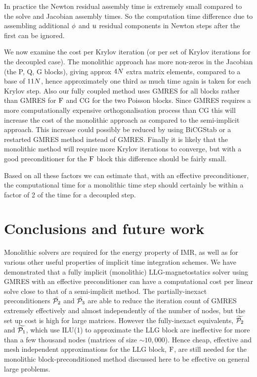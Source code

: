 In practice the Newton residual assembly time is extremely small compared to the solve and Jacobian assembly times.
So the computation time difference due to assembling additional $\phi$ and $u$ residual components in Newton steps after the first can be ignored.

We now examine the cost per Krylov iteration (or per set of Krylov iterations for the decoupled case).
The monolithic approach has more non-zeros in the Jacobian (the P, Q, G blocks), giving approx $4 N$ extra matrix elements, compared to a base of $11 N$, hence approximately one third as much time again is taken for each Krylov step.
Also our fully coupled method uses GMRES for all blocks rather than GMRES for $\mathrm{F}$ and CG for the two Poisson blocks.
Since GMRES requires a more computationally expensive orthogonalisation process than CG this will increase the cost of the monolithic approach as compared to the semi-implicit approach.
This increase could possibly be reduced by using BiCGStab or a restarted GMRES method instead of GMRES.
Finally it is likely that the monolithic method will require more Krylov iterations to converge, but with a good preconditioner for the $\mathrm{F}$ block this difference should be fairly small.

Based on all these factors we can estimate that, with an effective preconditioner, the computational time for a monolithic time step should certainly be within a factor of 2 of the time for a decoupled step.


\section{Conclusions and future work}

Monolithic solvers are required for the energy property of IMR, as well as for various other useful properties of implicit time integration schemes.
We have demonstrated that a fully implicit (monolithic) LLG-magnetostatics solver using GMRES with an effective preconditioner can have a computational cost per linear solve close to that of a semi-implicit method.
The partially-inexact preconditioners $\bar{\mathcal{P}_2}$ and $\bar{\mathcal{P}_3}$ are able to reduce the iteration count of GMRES extremely effectively and almost independently of the number of nodes, but the set up cost is high for large matrices.
However the fully-inexact equivalents, $\widetilde{\mathcal{P}_2}$ and  $\widetilde{\mathcal{P}_1}$, which use ILU(1) to approximate the LLG block are ineffective for more than a few thousand nodes (\ie matrices of size $\sim 10,000$).
Hence cheap, effective and mesh independent approximations for the LLG block, $\mathrm{F}$, are still needed for the monolithic block-preconditioned method discussed here to be effective on general large problems.

